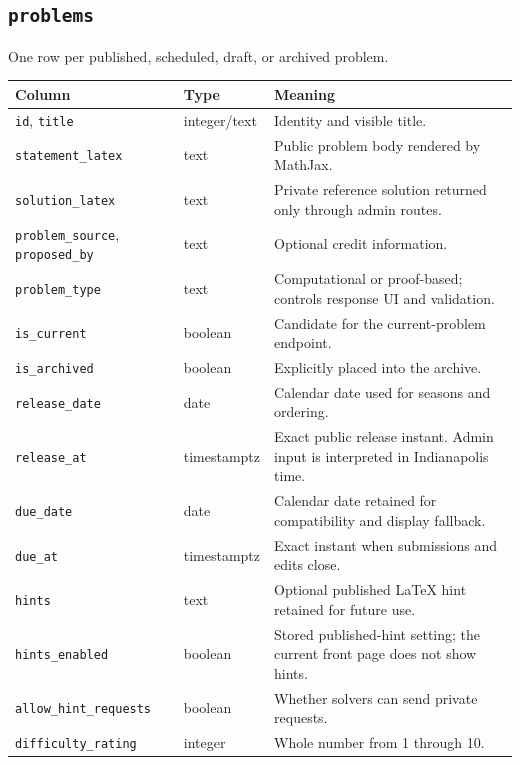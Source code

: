 \documentclass[11pt,oneside]{book}
\newcommand{\code}[1]{\texttt{#1}}
\begin{document}
\subsection{\code{problems}}
One row per published, scheduled, draft, or archived problem.
\begin{longtable}{p{} p{} p{}}
\toprule
Column & Type & Meaning \\
\midrule
\endhead
\code{id}, \code{title} & integer/text & Identity and visible title. \\
\code{statement\_latex} & text & Public problem body rendered by MathJax. \\
\code{solution\_latex} & text & Private reference solution returned only through admin routes. \\
\code{problem\_source}, \code{proposed\_by} & text & Optional credit information. \\
\code{problem\_type} & text & Computational or proof-based; controls response UI and validation. \\
\code{is\_current} & boolean & Candidate for the current-problem endpoint. \\
\code{is\_archived} & boolean & Explicitly placed into the archive. \\
\code{release\_date} & date & Calendar date used for seasons and ordering. \\
\code{release\_at} & timestamptz & Exact public release instant. Admin input is interpreted in Indianapolis time. \\
\code{due\_date} & date & Calendar date retained for compatibility and display fallback. \\
\code{due\_at} & timestamptz & Exact instant when submissions and edits close. \\
\code{hints} & text & Optional published LaTeX hint retained for future use. \\
\code{hints\_enabled} & boolean & Stored published-hint setting; the current front page does not show hints. \\
\code{allow\_hint\_requests} & boolean & Whether solvers can send private requests. \\
\code{difficulty\_rating} & integer & Whole number from 1 through 10. \\
\bottomrule
\end{longtable}
\end{document}
